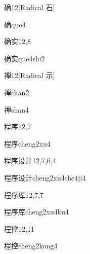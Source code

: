 \begin{entry}{确}{12}[Radical 石]
  \begin{phonetics}{确}{que4}
  \end{phonetics}
\end{entry}

\begin{entry}{确实}{12,8}
  \begin{phonetics}{确实}{que4shi2}
  \end{phonetics}
\end{entry}

\begin{entry}{禅}{12}[Radical 示]
  \begin{phonetics}{禅}{chan2}
  \end{phonetics}
  \begin{phonetics}{禅}{shan4}
  \end{phonetics}
\end{entry}

\begin{entry}{程序}{12,7}
  \begin{phonetics}{程序}{cheng2xu4}
  \end{phonetics}
\end{entry}

\begin{entry}{程序设计}{12,7,6,4}
  \begin{phonetics}{程序设计}{cheng2xu4she4ji4}
  \end{phonetics}
\end{entry}

\begin{entry}{程序库}{12,7,7}
  \begin{phonetics}{程序库}{cheng2xu4ku4}
  \end{phonetics}
\end{entry}

\begin{entry}{程控}{12,11}
  \begin{phonetics}{程控}{cheng2kong4}
  \end{phonetics}
\end{entry}

